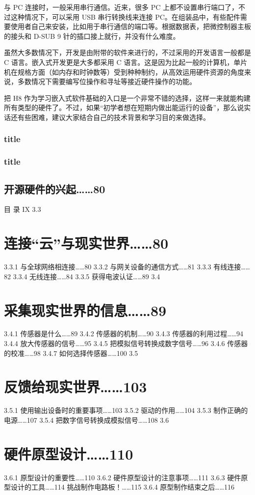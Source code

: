 \documentclass[12pt,UTF8]{ctexbook}
\begin{document}
与 PC 连接时，一般采用串行通信。近来，很多 PC 上都不设置串行端口了，不过这种情况下，可以采用 USB 串行转换线来连接 PC。在组装品中，有些配件需要使用者自己来安装，比如用于串行通信的端口等。根据数据表，把微控制器主板的接头和 D-SUB 9 针的插口接上就行，并没有什么难度。

虽然大多数情况下，开发是由附带的软件来进行的，不过采用的开发语言一般都是 C 语言。嵌入式开发更是大多都采用 C 语言。这是因为比起一般的计算机，单片机在规格方面（如内存和时钟数等）受到种种制约，从高效运用硬件资源的角度来说，多数情况下需要编写位操作和寻址等接近硬件操作的功能。

把 H8 作为学习嵌入式软件基础的入口是一个非常不错的选择，这样一来就能构建所有类型的硬件了。不过，如果“初学者想在短期内做出能运行的设备”，那么说实话还有些困难，建议大家结合自己的技术背景和学习目的来做选择。

\subsubsection{title}
\subsubsection{title}

\subsection{开源硬件的兴起……80}
目
录
IX
3.3
\section{连接“云”与现实世界……80}
3.3.1
与全球网络相连接……80
3.3.2
与网关设备的通信方式……81
3.3.3
有线连接……82
3.3.4
无线连接……84
3.3.5
获得电波认证……89
3.4
\section{采集现实世界的信息……89}
3.4.1
传感器是什么……89
3.4.2
传感器的机制……90
3.4.3
传感器的利用过程……94
3.4.4
放大传感器的信号……95
3.4.5
把模拟信号转换成数字信号……96
3.4.6
传感器的校准……98
3.4.7
如何选择传感器……100
3.5
\section{反馈给现实世界……103}
3.5.1
使用输出设备时的重要事项……103
3.5.2
驱动的作用……104
3.5.3
制作正确的电源……107
3.5.4
把数字信号转换成模拟信号……108
3.6
\section{硬件原型设计……110}
3.6.1
原型设计的重要性……110
3.6.2
硬件原型设计的注意事项……111
3.6.3
硬件原型设计的工具……114
挑战制作电路板！……115
3.6.4
原型制作结束之后……116
\end{document}
